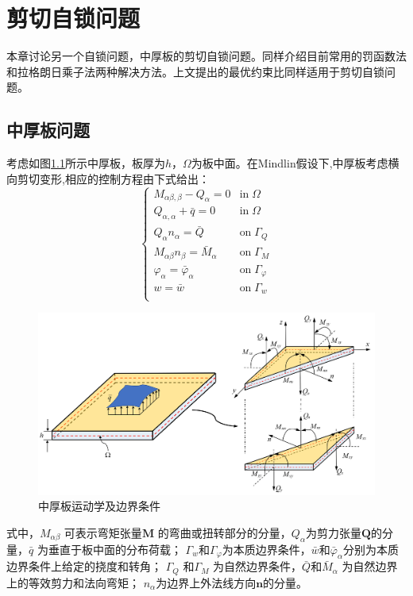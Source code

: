 \chapter{剪切自锁问题}
本章讨论另一个自锁问题，中厚板的剪切自锁问题。同样介绍目前常用的罚函数法和拉格朗日乘子法两种解决方法。上文提出的最优约束比同样适用于剪切自锁问题。

\section{中厚板问题}    
考虑如图\ref{ch_5:fig:mindlin_picture}所示中厚板，板厚为$h$，$\Omega$为板中面。在Mindlin假设下,中厚板考虑横向剪切变形,相应的控制方程由下式给出：
\begin{equation}\label{ch_5:eq:strong_mindlin}
    \begin{cases}
        M_{\alpha\beta,\beta} - Q_\alpha = 0 & \textrm{in}\; \Omega \\
        Q_{\alpha,\alpha} + \bar q = 0 & \textrm{in}\; \Omega \\    Q_\alpha n_\alpha = \bar Q & \textrm{on}\; \Gamma_Q \\
        M_{\alpha\beta} n_\beta = \bar M_\alpha & \textrm{on}\; \Gamma_M \\
        \varphi_\alpha = \bar \varphi_\alpha & \textrm{on}\; \Gamma_\varphi \\
        w = \bar w & \textrm{on}\; \Gamma_w \\
    \end{cases}
\end{equation}
\begin{figure}[!h]
    \centering 
        \includegraphics[scale=0.5]{figures/shearlocking/Mindlinplate.png}
        \caption{中厚板运动学及边界条件}\label{ch_5:fig:mindlin_picture}
\end{figure}
式中，$M_{\alpha \beta}$ 可表示弯矩张量$ \boldsymbol{M}$ 的弯曲或扭转部分的分量，$Q_\alpha$为剪力张量$\boldsymbol{Q}$的分量，$\bar{q}$ 为垂直于板中面的分布荷载；
$\Gamma_w$和$\Gamma_\varphi$为本质边界条件，$\bar{w}$和$\bar{\varphi}_\alpha$分别为本质边界条件上给定的挠度和转角；
$\Gamma_Q$ 和$\Gamma_M$ 为自然边界条件，$\bar Q$和$\bar{M}_{\alpha}$ 为自然边界上的等效剪力和法向弯矩；
$n_\alpha$为边界上外法线方向$\pmb{n}$的分量。

